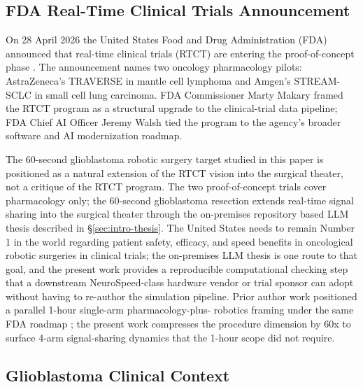 
\subsection{FDA Real-Time Clinical Trials Announcement}
\label{sec:intro-fda}

On 28 April 2026 the United States Food and Drug Administration (FDA)
announced that real-time clinical trials (RTCT) are entering the
proof-of-concept phase \cite{fda2026realtime}. The announcement names
two oncology pharmacology pilots: AstraZeneca's TRAVERSE in mantle cell
lymphoma and Amgen's STREAM-SCLC in small cell lung carcinoma. FDA
Commissioner Marty Makary framed the RTCT program as a structural
upgrade to the clinical-trial data pipeline; FDA Chief AI Officer
Jeremy Walsh tied the program to the agency's broader software and AI
modernization roadmap.

The 60-second glioblastoma robotic surgery target studied in this
paper is positioned as a natural extension of the RTCT vision into
the surgical theater, not a critique of the RTCT program. The two
proof-of-concept trials cover pharmacology only; the 60-second
glioblastoma resection extends real-time signal sharing into the
surgical theater through the on-premises repository based LLM thesis
described in \S\ref{sec:intro-thesis}. The United States needs to
remain Number 1 in the world regarding patient safety, efficacy, and
speed benefits in oncological robotic surgeries in clinical trials;
the on-premises LLM thesis is one route to that goal, and the
present work provides a reproducible computational checking step that
a downstream NeuroSpeed-class hardware vendor or trial sponsor can
adopt without having to re-author the simulation pipeline. Prior
author work positioned a parallel 1-hour single-arm pharmacology-plus-
robotics framing under the same FDA roadmap
\cite{kawchak_2026_19994945}; the present work compresses the
procedure dimension by 60x to surface 4-arm signal-sharing dynamics
that the 1-hour scope did not require.

\subsection{Glioblastoma Clinical Context}
\label{sec:intro-gbm}

